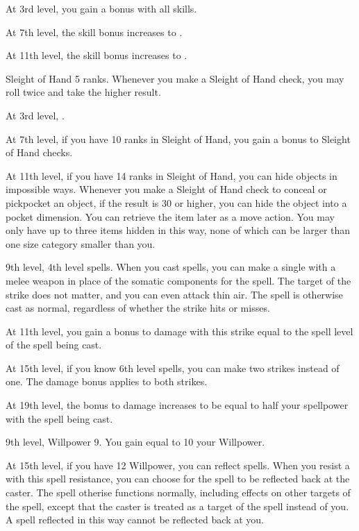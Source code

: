     At 3rd level, you gain a  bonus with all skills.

    At 7th level, the skill bonus increases to .

    At 11th level, the skill bonus increases to .

    \featpre Sleight of Hand 5 ranks.
    \featben Whenever you make a Sleight of Hand check, you may roll twice and take the higher result.

    At 3rd level, \tdash.

    At 7th level, if you have 10 ranks in Sleight of Hand, you gain a  bonus to Sleight of Hand checks.

    At 11th level, if you have 14 ranks in Sleight of Hand, you can hide objects in impossible ways.
    Whenever you make a Sleight of Hand check to conceal or pickpocket an object, if the result is 30 or higher, you can hide the object into a pocket dimension.
    You can retrieve the item later as a move action.
    You may only have up to three items hidden in this way, none of which can be larger than one size category smaller than you.

    \featpres 9th level, 4th level spells.
    \featben When you cast spells, you can make a single  with a melee weapon in place of the somatic components for the spell.
    The target of the strike does not matter, and you can even attack thin air.
    The spell is otherwise cast as normal, regardless of whether the strike hits or misses.

    At 11th level, you gain a bonus to damage with this strike equal to the spell level of the spell being cast.

    At 15th level, if you know 6th level spells, you can make two strikes instead of one.
    The damage bonus applies to both strikes.

    At 19th level, the bonus to damage increases to be equal to half your spellpower with the spell being cast.

    \featpres 9th level, Willpower 9.
    \featben You gain  equal to 10 \add your Willpower.

    At 15th level, if you have 12 Willpower, you can reflect spells.
    When you resist a  with this spell resistance, you can choose for the spell to be reflected back at the caster.
    The spell otherise functions normally, including effects on other targets of the spell, except that the caster is treated as a target of the spell instead of you.
    A spell reflected in this way cannot be reflected back at you.

